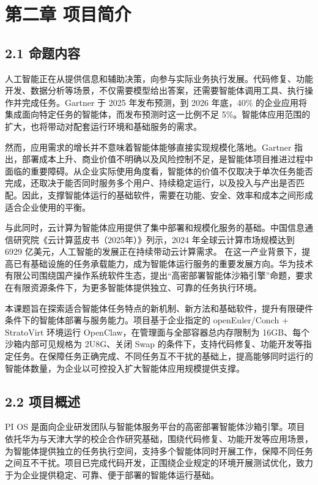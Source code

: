\section{第二章 项目简介}\label{ux7b2cux4e8cux7ae0-ux9879ux76eeux7b80ux4ecb}

\subsection{2.1 命题内容}\label{ux547dux9898ux5185ux5bb9}

人工智能正在从提供信息和辅助决策，向参与实际业务执行发展。代码修复、功能开发、数据分析等场景，不仅需要模型给出答案，还需要智能体调用工具、执行操作并完成任务。Gartner 于 2025 年发布预测，到 2026 年底，40\% 的企业应用将集成面向特定任务的智能体，而发布预测时这一比例不足 5\%。智能体应用范围的扩大，也将带动对配套运行环境和基础服务的需求。

然而，应用需求的增长并不意味着智能体能够直接实现规模化落地。Gartner 指出，部署成本上升、商业价值不明确以及风险控制不足，是智能体项目推进过程中面临的重要障碍。从企业实际使用角度看，智能体的价值不仅取决于单次任务能否完成，还取决于能否同时服务多个用户、持续稳定运行，以及投入与产出是否匹配。因此，支撑智能体运行的基础软件，需要在功能、安全、效率和成本之间形成适合企业使用的平衡。

与此同时，云计算为智能体应用提供了集中部署和规模化服务的基础。中国信息通信研究院《云计算蓝皮书（2025年）》列示，2024 年全球云计算市场规模达到 6929 亿美元，人工智能的发展正在持续带动云计算需求。 在这一产业背景下，提高已有基础设施的任务承载能力，成为智能体运行服务的重要发展方向。华为技术有限公司围绕国产操作系统软件生态，提出``高密部署智能体沙箱引擎''命题，要求在有限资源条件下，为更多智能体提供独立、可靠的任务执行环境。

本课题旨在探索适合智能体任务特点的新机制、新方法和基础软件，提升有限硬件条件下的智能体部署与服务能力。项目基于企业指定的 openEuler/Conch + StratoVirt 环境运行 OpenClaw，在管理面与全部容器总内存限制为 16GB、每个沙箱内部可见规格为 2U8G、关闭 Swap 的条件下，支持代码修复、功能开发等指定任务。在保障任务正确完成、不同任务互不干扰的基础上，提高能够同时运行的智能体数量，为企业以可控投入扩大智能体应用规模提供支撑。

\subsection{2.2 项目概述}\label{ux9879ux76eeux6982ux8ff0}

PI OS 是面向企业研发团队与智能体服务平台的高密部署智能体沙箱引擎。项目依托华为与天津大学的校企合作研究基础，围绕代码修复、功能开发等应用场景，为智能体提供独立的任务执行空间，支持多个智能体同时开展工作，保障不同任务之间互不干扰。项目已完成代码开发，正围绕企业规定的环境开展测试优化，致力于为企业提供稳定、可靠、便于部署的智能体运行基础。

